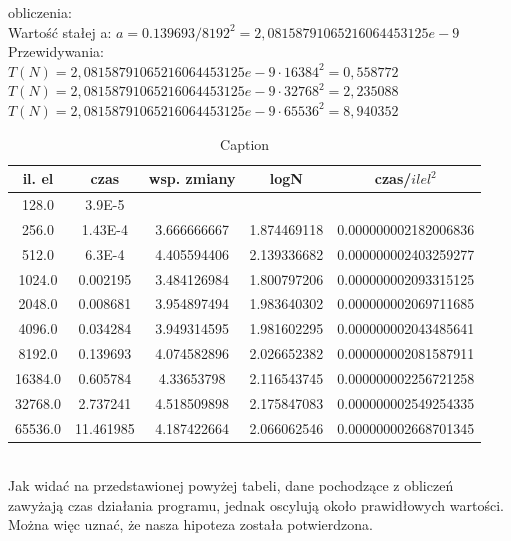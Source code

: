 \documentclass{article}
\begin{document}
obliczenia:\\
Wartość stałej a: $a =  0.139693/8192^2 = 2,08158791065216064453125e-9$\\
Przewidywania:\\
$T(N) = 2,08158791065216064453125e-9 \cdot 16384^2=0,558772$\\
$T(N) = 2,08158791065216064453125e-9 \cdot 32768^2=2,235088$\\
$T(N) = 2,08158791065216064453125e-9 \cdot 65536^2=8,940352$\\
\begin{table}[bhp]
    \centering
    \begin{tabular}{|c|c|c|c|c|}
        \hline
        il. el & czas & wsp. zmiany & logN & czas/$il el^2$\\ \hline
    	128.0 & 3.9E-5 & \  & \  & \  \\ \hline
    	256.0 & 1.43E-4 & 3.666666667 & 1.874469118 & 0.000000002182006836 \\ \hline
    	512.0 & 6.3E-4 & 4.405594406 & 2.139336682 & 0.000000002403259277 \\ \hline
    	1024.0 & 0.002195 & 3.484126984 & 1.800797206 & 0.000000002093315125 \\ \hline
    	2048.0 & 0.008681 & 3.954897494 & 1.983640302 & 0.000000002069711685 \\ \hline
    	4096.0 & 0.034284 & 3.949314595 & 1.981602295 & 0.000000002043485641 \\ \hline
    	8192.0 & 0.139693 & 4.074582896 & 2.026652382 & 0.000000002081587911 \\ \hline
    	16384.0 & 0.605784 & 4.33653798 & 2.116543745 & 0.000000002256721258 \\ \hline
    	32768.0 & 2.737241 & 4.518509898 & 2.175847083 & 0.000000002549254335 \\ \hline
    	65536.0 & 11.461985 & 4.187422664 & 2.066062546 & 0.000000002668701345 \\ \hline

    \end{tabular}
    \caption{Caption}
    \label{tab:my_label}
\end{table}\\
Jak widać na przedstawionej powyżej tabeli, dane pochodzące z obliczeń zawyżają czas działania programu, jednak oscylują około prawidłowych wartości. Można więc uznać, że nasza hipoteza została potwierdzona.
\end{document}
